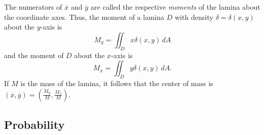 \vspace*{5pt}
\nin {}
\vspace*{5pt}

The numerators of $\overline{x}$ and $\overline{y}$ are called the respective \emph{moments} of the lamina about the coordinate axes. Thus, the moment of a lamina $D$ with density $\delta = \delta(x,y)$ about the $y$-axis is
\[M_y = \iint_D x\delta(x,y) \, dA\]
and the moment of  $D$ about the $x$-axis is
\[M_x = \iint_D y\delta(x,y) \, dA.\]
If $M$ is the mass of the lamina, it follows that the center of mass is $(\overline{x}, \overline{y}) = \left(\frac{M_y}{M}, \frac{M_x}{M}\right)$. 


%


\subsection*{Probability}

